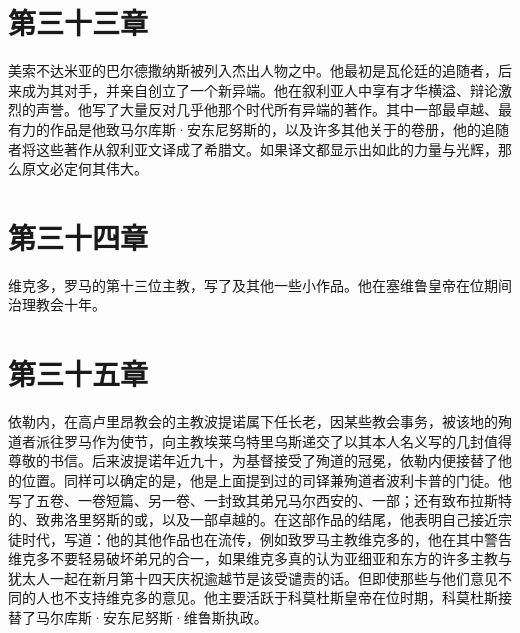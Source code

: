 
\section{第三十三章}

美索不达米亚的巴尔德撒纳斯被列入杰出人物之中。他最初是瓦伦廷的追随者，后来成为其对手，并亲自创立了一个新异端。他在叙利亚人中享有才华横溢、辩论激烈的声誉。他写了大量反对几乎他那个时代所有异端的著作。其中一部最卓越、最有力的作品是他致马尔库斯·安东尼努斯的，以及许多其他关于的卷册，他的追随者将这些著作从叙利亚文译成了希腊文。如果译文都显示出如此的力量与光辉，那么原文必定何其伟大。\newline{}\par


\section{第三十四章}

维克多，罗马的第十三位主教，写了及其他一些小作品。他在塞维鲁皇帝在位期间治理教会十年。\newline{}\par


\section{第三十五章}

依勒内，在高卢里昂教会的主教波提诺属下任长老，因某些教会事务，被该地的殉道者派往罗马作为使节，向主教埃莱乌特里乌斯递交了以其本人名义写的几封值得尊敬的书信。后来波提诺年近九十，为基督接受了殉道的冠冕，依勒内便接替了他的位置。同样可以确定的是，他是上面提到过的司铎兼殉道者波利卡普的门徒。他写了五卷、一卷短篇、另一卷、一封致其弟兄马尔西安的、一部；还有致布拉斯特的、致弗洛里努斯的或，以及一部卓越的。在这部作品的结尾，他表明自己接近宗徒时代，写道：他的其他作品也在流传，例如致罗马主教维克多的，他在其中警告维克多不要轻易破坏弟兄的合一，如果维克多真的认为亚细亚和东方的许多主教与犹太人一起在新月第十四天庆祝逾越节是该受谴责的话。但即使那些与他们意见不同的人也不支持维克多的意见。他主要活跃于科莫杜斯皇帝在位时期，科莫杜斯接替了马尔库斯·安东尼努斯·维鲁斯执政。\newline{}\par

